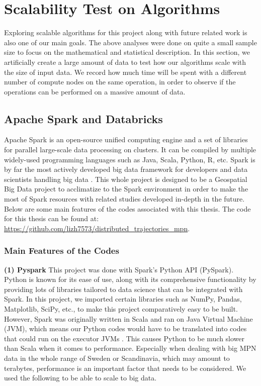 \documentclass[12pt]{article}
\theoremstyle{definition}
\begin{document}
\newpage








\section{Scalability Test on Algorithms}
Exploring scalable algorithms for this project along with future related work is also one of our main goals. The above analyses were done on quite a small sample size to focus on the mathematical and statistical description. In this section, we artificially create a large amount of data to test how our algorithms scale with the size of input data. We record how much time will be spent with a different number of compute nodes on the same operation, in order to observe if the operations can be performed on a massive amount of data.

\subsection{Apache Spark and Databricks}
Apache Spark is an open-source unified computing engine and a set of libraries for parallel large-scale data processing on clusters. It can be compiled by multiple widely-used programming languages such as Java, Scala, Python, R, etc. Spark is by far the most actively developed big data framework for developers and data scientists handling big data \cite{spark_guide_2018}. This whole project is designed to be a Geospatial Big Data project to acclimatize to the Spark environment in order to make the most of Spark resources with related studies developed in-depth in the future. Below are some main features of the codes associated with this thesis. The code for this thesis can be found at: \url{https://github.com/lizh7573/distributed_trajectories_mpn}.

\subsubsection{Main Features of the Codes}
\textbf{(1) Pyspark}
This project was done with Spark’s Python API (PySpark). Python is known for its ease of use, along with its comprehensive functionality by providing lots of libraries tailored to data science that can be integrated with Spark. In this project, we imported certain libraries such as NumPy, Pandas, Matplotlib, SciPy, etc., to make this project comparatively easy to be built. However, Spark was originally written in Scala and ran on Java Virtual Machine (JVM), which means our Python codes would have to be translated into codes that could run on the executor JVMs \cite{spark_guide_2018}. This causes Python to be much slower than Scala when it comes to performance. Especially when dealing with big MPN data in the whole range of Sweden or Scandinavia, which may amount to terabytes, performance is an important factor that needs to be considered. We used the following to be able to scale to big data.
\end{document}
